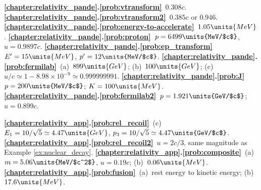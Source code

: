 

\noindent
{\bf \ref{chapter:relativity_pande}.\ref{prob:vtransform}}~$0.308c$.
{\bf \ref{chapter:relativity_pande}.\ref{prob:vtransform2}}~$0.385c$ or 
$0.946$.
{\bf \ref{chapter:relativity_pande}.\ref{prob:energy-to-accelerate}}~$1.05\units{MeV}$. 
{\bf \ref{chapter:relativity_pande}.\ref{prob:proton}}~$p = 6499\units{MeV/$c$}$, $u = 0.9897c$.
{\bf \ref{chapter:relativity_pande}.\ref{prob:ep_transform}}~$E^\prime = 
15\units{MeV}$, $p^\prime = 12\units{MeV/$c$}$.
{\bf \ref{chapter:relativity_pande}.\ref{prob:fermilab}}~(a)~$899\units{GeV}$; 
(b)~$100\units{GeV}$; 
(c)~$u/c \simeq 1 - 8.98\times 10^{-9} \simeq 0.999999991$.
{\bf \ref{chapter:relativity_pande}.\ref{prob:J}}~$p = 200\units{MeV/$c$}$; 
$K = 100\units{MeV}$.
{\bf \ref{chapter:relativity_pande}.\ref{prob:fermilab2}}~$p = 1.921\units{GeV/$c$}$; $u = 0.899c$.
\medskip


\noindent
{\bf \ref{chapter:relativity_app}.\ref{prob:rel_recoil}}~(c)~$E_1 = 
10/\sqrt{5} \simeq 4.47\units{GeV}$, 
$p_3 = 10/\sqrt{5} \simeq 4.47\units{GeV/$c$}$.
{\bf \ref{chapter:relativity_app}.\ref{prob:rel_recoil2}}~$u = 2c/3$, 
same magnitude as Example \ref{ex:nuclear_decay}.
{\bf \ref{chapter:relativity_app}.\ref{prob:composite}}~(a)~$m = 
5.06\units{MeV/$c^2$}$, $u = 0.19c$; (b)~$0.06\units{MeV}$.
{\bf \ref{chapter:relativity_app}.\ref{prob:fusion}}~(a)~rest energy to 
kinetic energy; (b)~$17.6\units{MeV}$.
\medskip





